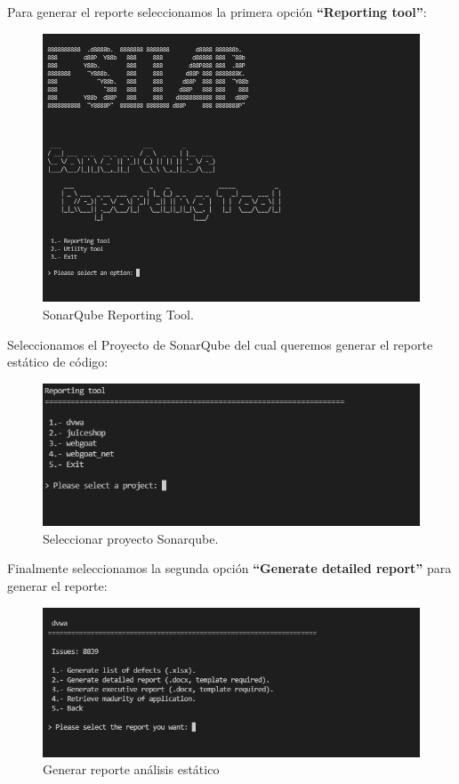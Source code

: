 \newpage
Para generar el reporte seleccionamos la primera opción \textbf{“Reporting tool”}:
\begin{figure}[!htb] 
    \centering
    \captionsetup{width=1\linewidth}   
    \includegraphics[scale=0.8]{./imagenes/017_SonarQubeReportTool_1.png}
    \caption{SonarQube Reporting Tool.}  
    \label{fig:15 - SonarQube Reporting tool}
\end{figure}

Seleccionamos el Proyecto de SonarQube del cual queremos generar el reporte estático de código:
\begin{figure}[!htb] 
    \centering
    \captionsetup{width=1\linewidth}   
    \includegraphics[width=\linewidth]{./imagenes/017_SonarQubeReportTool_2.png}
    \caption{Seleccionar proyecto Sonarqube.}  
    \label{fig:16}
\end{figure}

\newpage
Finalmente seleccionamos la segunda opción \textbf{“Generate detailed report”} para generar el reporte:

\begin{figure}[!htb]
    \centering
    \captionsetup{width=1\linewidth}     
    \includegraphics[scale=0.8]{./imagenes/017_SonarQubeReportTool_3.png}
    \caption{Generar reporte análisis estático}  
    \label{fig:17}
\end{figure}

